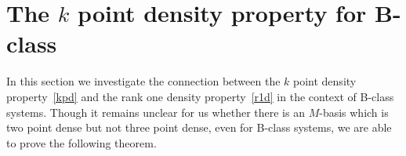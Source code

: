 \documentclass[12pt,oneside,a4paper]{amsart}
\begin{document}



    \section{The \texorpdfstring{$k$}{k} point density property for B-class}
      \label{sec:kpd}
      In this section we investigate the connection between the $k$ point density property~\eqref{kpd} and
        the rank one density property~\eqref{r1d} in the context of B-class systems.
      Though it remains unclear for us whether there is an $M$-basis which is two point dense but not three point dense,
        even for B-class systems, we are able to prove the following theorem.
\end{document}
